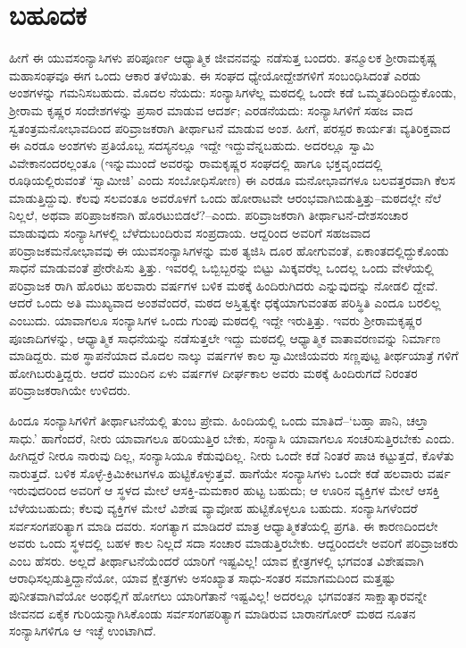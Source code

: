 
\chapter{ಬಹೂದಕ}

\noindent

ಹೀಗೆ ಈ ಯುವಸಂನ್ಯಾಸಿಗಳು ಪರಿಪೂರ್ಣ ಆಧ್ಯಾತ್ಮಿಕ ಜೀವನವನ್ನು ನಡೆಸುತ್ತ ಬಂದರು. ತನ್ಮೂಲಕ ಶ್ರೀರಾಮಕೃಷ್ಣ ಮಹಾಸಂಘವೂ ಈಗ ಒಂದು ಆಕಾರ ತಳೆಯಿತು. ಈ ಸಂಘದ ಧ್ಯೇಯೋದ್ದೇಶಗಳಿಗೆ ಸಂಬಂಧಿಸಿದಂತೆ ಎರಡು ಅಂಶಗಳನ್ನು ಗಮನಿಸಬಹುದು. ಮೊದಲ ನೆಯದು: ಸಂನ್ಯಾಸಿಗಳೆಲ್ಲ ಮಠದಲ್ಲಿ ಒಂದೇ ಕಡೆ ಒಮ್ಮತದಿಂದಿದ್ದುಕೊಂಡು, ಶ್ರೀರಾಮ ಕೃಷ್ಣರ ಸಂದೇಶಗಳನ್ನು ಪ್ರಸಾರ ಮಾಡುವ ಆದರ್ಶ; ಎರಡನೆಯದು: ಸಂನ್ಯಾಸಿಗಳಿಗೆ ಸಹಜ ವಾದ ಸ್ವತಂತ್ರಮನೋಭಾವದಿಂದ ಪರಿವ್ರಾಜಕರಾಗಿ ತೀರ್ಥಾಟನೆ ಮಾಡುವ ಅಂಶ. ಹೀಗೆ, ಪರಸ್ಪರ ಕಾರ್ಯತಃ ವ್ಯತಿರಿಕ್ತವಾದ ಈ ಎರಡೂ ಅಂಶಗಳು ಪ್ರತಿಯೊಬ್ಬ ಸದಸ್ಯನಲ್ಲೂ ಇದ್ದೇ ಇದ್ದುವೆನ್ನಬಹುದು. ಅದರಲ್ಲೂ ಸ್ವಾಮಿ ವಿವೇಕಾನಂದರಲ್ಲಂತೂ (ಇನ್ನುಮುಂದೆ ಅವರನ್ನು ರಾಮಕೃಷ್ಣರ ಸಂಘದಲ್ಲಿ ಹಾಗೂ ಭಕ್ತವೃಂದದಲ್ಲಿ ರೂಢಿಯಲ್ಲಿರುವಂತೆ ‘ಸ್ವಾಮೀಜಿ’ ಎಂದು ಸಂಬೋಧಿಸೋಣ) ಈ ಎರಡೂ ಮನೋಭಾವಗಳೂ ಬಲವತ್ತರವಾಗಿ ಕೆಲಸ ಮಾಡುತ್ತಿದ್ದುವು. ಕೆಲವು ಸಲವಂತೂ ಅವರೊಳಗೆ ಒಂದು ಹೋರಾಟವೇ ಆರಂಭವಾಗಿಬಿಡುತ್ತಿತ್ತು–ಮಠದಲ್ಲೇ ನೆಲೆ ನಿಲ್ಲಲೆ, ಅಥವಾ ಪರಿಪ್ರಾಜಕನಾಗಿ ಹೊರಟುಬಿಡಲೆ?–ಎಂದು. ಪರಿವ್ರಾಜಕರಾಗಿ ತೀರ್ಥಾಟನೆ-ದೇಶಸಂಚಾರ ಮಾಡುವುದು ಸಂನ್ಯಾಸಿಗಳಲ್ಲಿ ಬೆಳೆದುಬಂದಿರುವ ಸಂಪ್ರದಾಯ. ಆದ್ದರಿಂದ ಅವರಿಗೆ ಸಹಜವಾದ ಪರಿವ್ರಾಜಕಮನೋಭಾವವು ಈ ಯುವಸಂನ್ಯಾಸಿಗಳನ್ನು ಮಠ ತ್ಯಜಿಸಿ ದೂರ ಹೋಗುವಂತೆ, ಏಕಾಂತದಲ್ಲಿದ್ದುಕೊಂಡು ಸಾಧನೆ ಮಾಡುವಂತೆ ಪ್ರೇರೇಪಿಸು ತ್ತಿತ್ತು. ಇವರಲ್ಲಿ ಒಬ್ಬಿಬ್ಬರನ್ನು ಬಿಟ್ಟು ಮಿಕ್ಕವರೆಲ್ಲ ಒಂದಲ್ಲ ಒಂದು ವೇಳೆಯಲ್ಲಿ ಪರಿವ್ರಾಜಕ ರಾಗಿ ಹೊರಟು ಹಲವಾರು ವರ್ಷಗಳ ಬಳಿಕ ಮಠಕ್ಕೆ ಹಿಂದಿರುಗಿದರು ಎನ್ನುವುದನ್ನು ನೋಡಲಿ ದ್ದೇವೆ. ಆದರೆ ಒಂದು ಅತಿ ಮುಖ್ಯವಾದ ಅಂಶವೆಂದರೆ, ಮಠದ ಅಸ್ತಿತ್ವಕ್ಕೇ ಧಕ್ಕೆಯಾಗುವಂತಹ ಪರಿಸ್ಥಿತಿ ಎಂದೂ ಬರಲಿಲ್ಲ ಎಂಬುದು. ಯಾವಾಗಲೂ ಸಂನ್ಯಾಸಿಗಳ ಒಂದು ಗುಂಪು ಮಠದಲ್ಲಿ ಇದ್ದೇ ಇರುತ್ತಿತ್ತು. ಇವರು ಶ್ರೀರಾಮಕೃಷ್ಣರ ಪೂಜಾದಿಗಳನ್ನು, ಆಧ್ಯಾತ್ಮಿಕ ಸಾಧನೆಯನ್ನು ನಡೆಸುತ್ತಲೇ ಇದ್ದು ಮಠದಲ್ಲಿ ಆಧ್ಯಾತ್ಮಿಕ ವಾತಾವರಣವನ್ನು ನಿರ್ಮಾಣ ಮಾಡಿದ್ದರು. ಮಠ ಸ್ಥಾಪನೆಯಾದ ಮೊದಲ ನಾಲ್ಕು ವರ್ಷಗಳ ಕಾಲ ಸ್ವಾಮೀಜಿಯವರು ಸಣ್ಣಪುಟ್ಟ ತೀರ್ಥಯಾತ್ರೆ ಗಳಿಗೆ ಹೋಗಿಬರುತ್ತಿದ್ದರು. ಆದರೆ ಮುಂದಿನ ಏಳು ವರ್ಷಗಳ ದೀರ್ಘಕಾಲ ಅವರು ಮಠಕ್ಕೆ ಹಿಂದಿರುಗದೆ ನಿರಂತರ ಪರಿವ್ರಾಜಕರಾಗಿಯೇ ಉಳಿದರು.

ಹಿಂದೂ ಸಂನ್ಯಾಸಿಗಳಿಗೆ ತೀರ್ಥಾಟನೆಯಲ್ಲಿ ತುಂಬ ಪ್ರೇಮ. ಹಿಂದಿಯಲ್ಲಿ ಒಂದು ಮಾತಿದೆ–‘ಬಹ್ತಾ ಪಾನಿ, ಚಲ್ತಾ ಸಾಧು.’ ಹಾಗೆಂದರೆ, ನೀರು ಯಾವಾಗಲೂ ಹರಿಯುತ್ತಿರ ಬೇಕು, ಸಂನ್ಯಾಸಿ ಯಾವಾಗಲೂ ಸಂಚರಿಸುತ್ತಿರಬೇಕು ಎಂದು. ಹೀಗಿದ್ದರೆ ನೀರೂ ನಾರುವು ದಿಲ್ಲ, ಸಂನ್ಯಾಸಿಯೂ ಕೆಡುವುದಿಲ್ಲ. ನೀರು ಒಂದೇ ಕಡೆ ನಿಂತರೆ ಪಾಚಿ ಕಟ್ಟುತ್ತದೆ, ಕೊಳೆತು ನಾರುತ್ತದೆ. ಬಳಿಕ ಸೊಳ್ಳೆ-ಕ್ರಿಮಿಕೀಟಗಳೂ ಹುಟ್ಟಿಕೊಳ್ಳುತ್ತವೆ. ಹಾಗೆಯೇ ಸಂನ್ಯಾಸಿಗಳು ಒಂದೇ ಕಡೆ ಹಲವಾರು ವರ್ಷ ಇರುವುದರಿಂದ ಅವರಿಗೆ ಆ ಸ್ಥಳದ ಮೇಲೆ ಆಸಕ್ತಿ-ಮಮಕಾರ ಹುಟ್ಟ ಬಹುದು; ಆ ಊರಿನ ವ್ಯಕ್ತಿಗಳ ಮೇಲೆ ಆಸಕ್ತಿ ಬೆಳೆಯಬಹುದು; ಕೆಲವು ವ್ಯಕ್ತಿಗಳ ಮೇಲೆ ವಿಶೇಷ ವ್ಯಾವೋಹ ಹುಟ್ಟಿಕೊಳ್ಳಲೂ ಬಹುದು. ಸಂನ್ಯಾಸಿಗಳೆಂದರೆ ಸರ್ವಸಂಗಪರಿತ್ಯಾಗ ಮಾಡಿ ದವರು. ಸಂಗತ್ಯಾಗ ಮಾಡಿದರೆ ಮಾತ್ರ ಆಧ್ಯಾತ್ಮಿಕತೆಯಲ್ಲಿ ಪ್ರಗತಿ. ಈ ಕಾರಣದಿಂದಲೇ ಅವರು ಒಂದು ಸ್ಥಳದಲ್ಲಿ ಬಹಳ ಕಾಲ ನಿಲ್ಲದೆ ಸದಾ ಸಂಚಾರ ಮಾಡುತ್ತಿರಬೇಕು. ಆದ್ದರಿಂದಲೇ ಅವರಿಗೆ ಪರಿವ್ರಾಜಕರು ಎಂಬ ಹೆಸರು. ಅಲ್ಲದೆ ತೀರ್ಥಾಟನೆಯೆಂದರೆ ಯಾರಿಗೆ ಇಷ್ಟವಿಲ್ಲ! ಯಾವ ಕ್ಷೇತ್ರಗಳಲ್ಲಿ ಭಗವಂತ ವಿಶೇಷವಾಗಿ ಆರಾಧಿಸಲ್ಪಡುತ್ತಿದ್ದಾನೆಯೋ, ಯಾವ ಕ್ಷೇತ್ರಗಳು ಅಸಂಖ್ಯಾತ ಸಾಧು-ಸಂತರ ಸಮಾಗಮದಿಂದ ಮತ್ತಷ್ಟು ಪುನೀತವಾಗಿವೆಯೋ ಅಂಥಲ್ಲಿಗೆ ಹೋಗಲು ಯಾರಿಗೆತಾನೆ ಇಷ್ಟವಿಲ್ಲ! ಅದರಲ್ಲೂ ಭಗವಂತನ ಸಾಕ್ಷಾತ್ಕಾರವನ್ನೇ ಜೀವನದ ಏಕೈಕ ಗುರಿಯನ್ನಾಗಿಸಿಕೊಂಡು ಸರ್ವಸಂಗಪರಿತ್ಯಾಗ ಮಾಡಿರುವ ಬಾರಾನಗೋರ್ ಮಠದ ನೂತನ ಸಂನ್ಯಾಸಿಗಳಿಗೂ ಆ ಇಚ್ಛೆ ಉಂಟಾಗಿದೆ.

